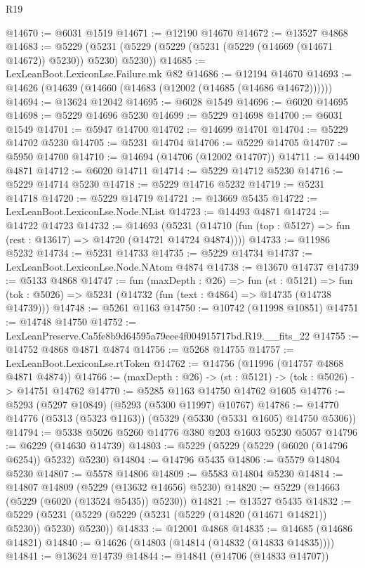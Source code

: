 \begin{lexlean}{R19}
\begin{coremodule}
@14670 := @6031 @1519
@14671 := @12190 @14670
@14672 := @13527 @4868
@14683 := @5229 (@5231 (@5229 (@5229 (@5231 (@5229 (@14669 (@14671 @14672)) @5230)) @5230) @5230))
@14685 := LexLeanBoot.LexiconLse.Failure.mk @82
@14686 := @12194 @14670
@14693 := @14626 (@14639 (@14660 (@14683 (@12002 (@14685 (@14686 @14672))))))
@14694 := @13624 @12042
@14695 := @6028 @1549
@14696 := @6020 @14695
@14698 := @5229 @14696 @5230
@14699 := @5229 @14698
@14700 := @6031 @1549
@14701 := @5947 @14700
@14702 := @14699 @14701
@14704 := @5229 @14702 @5230
@14705 := @5231 @14704
@14706 := @5229 @14705
@14707 := @5950 @14700
@14710 := @14694 (@14706 (@12002 @14707))
@14711 := @14490 @4871
@14712 := @6020 @14711
@14714 := @5229 @14712 @5230
@14716 := @5229 @14714 @5230
@14718 := @5229 @14716 @5232
@14719 := @5231 @14718
@14720 := @5229 @14719
@14721 := @13669 @5435
@14722 := LexLeanBoot.LexiconLse.Node.NList
@14723 := @14493 @4871
@14724 := @14722 @14723
@14732 := @14693
    (@5231 (@14710 (fun (top : @5127) => fun (rest : @13617) => @14720 (@14721 @14724 @4874))))
@14733 := @11986 @5232
@14734 := @5231 @14733
@14735 := @5229 @14734
@14737 := LexLeanBoot.LexiconLse.Node.NAtom @4874
@14738 := @13670 @14737
@14739 := @5133 @4868
@14747 := fun (maxDepth : @26) =>
  fun (st : @5121) =>
  fun (tok : @5026) => @5231 (@14732 (fun (text : @4864) => @14735 (@14738 @14739)))
@14748 := @5261 @1163
@14750 := @10742 (@11998 @10851)
@14751 := @14748 @14750
@14752 := LexLeanPreserve.Ca5fe8b9d64595a79eee4f004915717bd.R19.__fits_22
@14755 := @14752 @4868 @4871 @4874
@14756 := @5268 @14755
@14757 := LexLeanBoot.LexiconLse.rtToken
@14762 := @14756 (@11996 (@14757 @4868 @4871 @4874))
@14766 := (maxDepth : @26) -> (st : @5121) -> (tok : @5026) -> @14751 @14762
@14770 := @5285 @1163 @14750 @14762 @1605
@14776 := @5293 (@5297 @10849) (@5293 (@5300 @11997) @10767)
@14786 := @14770 @14776 (@5313 (@5323 @1163)) (@5329 (@5330 (@5331 @1605) @14750 @5306))
@14794 := @5338 @5026 @5260 @14776 @380 @203 @1603 @5230 @5057
@14796 := @6229 (@14630 @14739)
@14803 := @5229 (@5229 (@5229 (@6020 (@14796 @6254)) @5232) @5230)
@14804 := @14796 @5435
@14806 := @5579 @14804 @5230
@14807 := @5578 @14806
@14809 := @5583 @14804 @5230
@14814 := @14807 @14809 (@5229 (@13632 @14656) @5230)
@14820 := @5229 (@14663 (@5229 (@6020 (@13524 @5435)) @5230))
@14821 := @13527 @5435
@14832 := @5229 (@5231 (@5229 (@5229 (@5231 (@5229 (@14820 (@14671 @14821)) @5230)) @5230) @5230))
@14833 := @12001 @4868
@14835 := @14685 (@14686 @14821)
@14840 := @14626 (@14803 (@14814 (@14832 (@14833 @14835))))
@14841 := @13624 @14739
@14844 := @14841 (@14706 (@14833 @14707))

\end{coremodule}
\end{lexlean}
